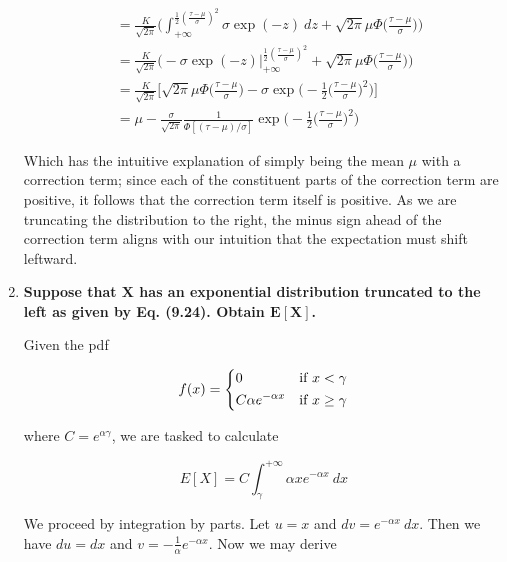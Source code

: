\documentclass[10pt, oneside]{article}   	%
\theoremstyle{definition}
\begin{document}
\begin{enumerate}[label=9.\arabic*]
\begin{align*}
&= \frac{K}{\sqrt{2\pi}} \bigg( \int^{\frac{1}{2} ( \frac{\tau-\mu}{\sigma} )^2}_{+\infty} \sigma \exp(-z) \ dz + \sqrt{2\pi} \mu \Phi \bigg( \frac{\tau-\mu}{\sigma} \bigg) \bigg) \\
&= \frac{K}{\sqrt{2\pi}} \bigg( -\sigma \exp(-z) \bigg|^{\frac{1}{2} ( \frac{\tau-\mu}{\sigma} )^2}_{+\infty} + \sqrt{2\pi} \mu \Phi \bigg( \frac{\tau-\mu}{\sigma} \bigg) \bigg) \\
&= \frac{K}{\sqrt{2\pi}} \bigg[ \sqrt{2\pi} \mu \Phi \bigg( \frac{\tau-\mu}{\sigma} \bigg) - \sigma \exp \bigg( -\frac{1}{2} \bigg( \frac{\tau-\mu}{\sigma} \bigg)^2 \bigg) \bigg] \\
&= \boxed{ \mu - \frac{\sigma}{\sqrt{2\pi}} \frac{1}{\Phi [(\tau-\mu)/\sigma]} \exp \bigg( -\frac{1}{2} \bigg( \frac{\tau-\mu}{\sigma} \bigg)^2 \bigg) }
\end{align*}

Which has the intuitive explanation of simply being the mean $\mu$ with a correction term; since each of the constituent parts of the correction term are positive, it follows that the correction term itself is positive. As we are truncating the distribution to the right, the minus sign ahead of the correction term aligns with our intuition that the expectation must shift leftward.

\item  \begin{tcolorbox}[
  colback=Cerulean!5!white,
  colframe=Cerulean!75!black]
\textbf{Suppose that $\bm{X}$ has an exponential distribution truncated to the left as given by Eq. (9.24). Obtain $\bm{E[X]}$.}
\end{tcolorbox}

Given the pdf

\[
f(x) = \begin{dcases}
0 & \text{if } x < \gamma \\
C\alpha e^{-\alpha x} & \text{if } x \geq \gamma
\end{dcases}
\]

where $C = e^{\alpha \gamma}$, we are tasked to calculate

\[ E[X] = C \int^{+\infty}_\gamma \alpha x e^{-\alpha x} \ dx \]

We proceed by integration by parts. Let $u = x$ and $dv = e^{-\alpha x} \ dx$. Then we have $du = dx$ and $v = -\frac{1}{\alpha} e^{-\alpha x}$. Now we may derive


\end{enumerate}
\end{document}
